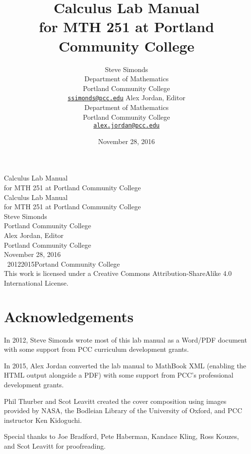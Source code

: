 \documentclass[12pt,]{book}
\title{Calculus Lab Manual\\
{\large for MTH 251 at Portland Community College}}
\author{Steve Simonds\\
Department of Mathematics\\
Portland Community College\\
\href{mailto:ssimonds@pcc.edu}{\nolinkurl{ssimonds@pcc.edu}}
Alex Jordan, Editor\\
Department of Mathematics\\
Portland Community College\\
\href{mailto:alex.jordan@pcc.edu}{\nolinkurl{alex.jordan@pcc.edu}}
}
\date{November 28, 2016}
\theoremstyle{plain}
\theoremstyle{definition}
\theoremstyle{definition}
\theoremstyle{definition}
\theoremstyle{definition}
\theoremstyle{definition}
\numberwithin{equation}{section}
\begin{document}
\frontmatter
\thispagestyle{empty}
{\centering
\vspace*{0.28\textheight}
{\Huge Calculus Lab Manual}\\[2\baselineskip]
{\LARGE for MTH 251 at Portland Community College}\\
}
\clearpage
\thispagestyle{empty}
\null%
\clearpage
\thispagestyle{empty}
{\centering
\vspace*{0.14\textheight}
{\Huge Calculus Lab Manual}\\[\baselineskip]
{\LARGE for MTH 251 at Portland Community College}\\[3\baselineskip]
{\Large Steve Simonds}\\[0.5\baselineskip]
{\Large Portland Community College}\\[3\baselineskip]
{\Large Alex Jordan, Editor}\\[0.5\baselineskip]
{\Large Portland Community College}\\[3\baselineskip]
{\Large November 28, 2016}\\}
\clearpage
\thispagestyle{empty}
\noindent\textcopyright\ 2012\textendash{}2015\quad{}Portand Community College\\[0.5\baselineskip]
This work is licensed under a Creative Commons Attribution-ShareAlike 4.0 International License.\par\medskip
{}
\null\clearpage
\chapter*{Acknowledgements}\label{acknowledgement-1}
In 2012, Steve Simonds wrote most of this lab manual as a Word/PDF document with some support from PCC curriculum development grants.%
\par
In 2015, Alex Jordan converted the lab manual to MathBook XML (enabling the HTML output alongside a PDF) with some support from PCC's professional development grants.%
\par
Phil Thurber and Scot Leavitt created the cover composition using images provided by NASA, the Bodleian Library of the University of Oxford, and PCC instructor Ken Kidoguchi.%
\par
Special thanks to Joe Bradford, Pete Haberman, Kandace Kling, Ross Kouzes, and Scot Leavitt for proofreading.%
\end{document}
